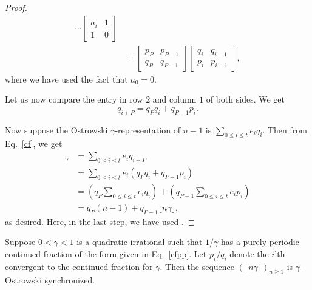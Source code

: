 \documentclass[12pt,reqno]{article}
\begin{document}
\begin{proof}
\begin{align*}
\cdots
\left[ \begin{array}{cc} a_i & 1 \\ 1 & 0  \end{array} \right] \\
&= \left[ \begin{array}{cc} p_P & p_{P-1} \\ q_P & q_{P-1}  \end{array}\right] 
\left[ \begin{array}{cc} q_i & q_{i-1} \\ p_i & p_{i-1} \end{array}\right] ,
\end{align*}
where we have used the fact that $a_0 = 0$.

Let us now compare the entry in row $2$ and column $1$ of both sides.
We get
\begin{equation}
 q_{i+P} = q_P q_i + q_{P-1} p_i.
 \label{cf}
\end{equation}

Now suppose the Ostrowski $\gamma$-representation of
$n-1$ is $\sum_{0 \leq i \leq t} e_i q_i$.
Then from Eq.~\eqref{cf}, we get
\begin{align*}
[(n-1)_\gamma 0^P]_\gamma &= \sum_{0 \leq i \leq t} e_i q_{i+P} \\
&= \sum_{0 \leq i \leq t} e_i (q_P q_i + q_{P-1} p_i) \\
&= \left(q_P \sum_{0 \leq i \leq t} e_i q_i \right) + 
\left(q_{P-1} \sum_{0 \leq i \leq t} e_i p_i \right) \\
&=  q_{P} (n-1) + q_{P-1} \lfloor n \gamma \rfloor ,
\end{align*}
as desired.
Here, in the last step, we have used \cite[Corollary 9.1.14]{Allouche&Shallit:2003}.
\end{proof}

\begin{corollary}
Suppose $0 < \gamma < 1$ is a quadratic irrational
such that $1/\gamma$ has a purely periodic continued
fraction of the form given in Eq.~\eqref{cfpp}. 
Let $p_i/q_i$ denote the $i$'th convergent to the 
continued fraction for $\gamma$.
Then the sequence $(\lfloor n \gamma \rfloor)_{n \geq 1}$
is $\gamma$-Ostrowski synchronized.
\label{five}
\end{corollary}
\end{document}
